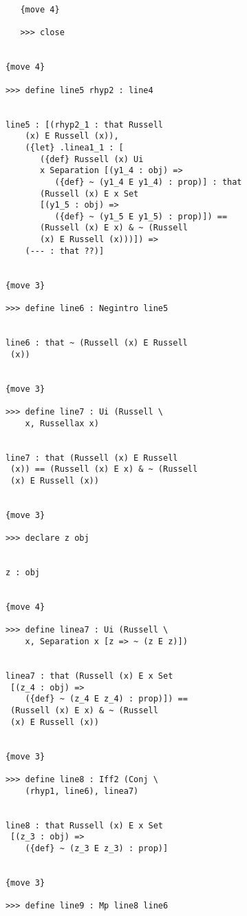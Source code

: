 \documentclass[12pt]{article}
\begin{document}
\begin{verbatim}
               {move 4}

               >>> close


            {move 4}

            >>> define line5 rhyp2 : line4


            line5 : [(rhyp2_1 : that Russell 
                (x) E Russell (x)), 
                ({let} .linea1_1 : [
                   ({def} Russell (x) Ui 
                   x Separation [(y1_4 : obj) => 
                      ({def} ~ (y1_4 E y1_4) : prop)] : that 
                   (Russell (x) E x Set 
                   [(y1_5 : obj) => 
                      ({def} ~ (y1_5 E y1_5) : prop)]) == 
                   (Russell (x) E x) & ~ (Russell 
                   (x) E Russell (x)))]) => 
                (--- : that ??)]


            {move 3}

            >>> define line6 : Negintro line5


            line6 : that ~ (Russell (x) E Russell 
             (x))


            {move 3}

            >>> define line7 : Ui (Russell \
                x, Russellax x)


            line7 : that (Russell (x) E Russell 
             (x)) == (Russell (x) E x) & ~ (Russell 
             (x) E Russell (x))


            {move 3}

            >>> declare z obj


            z : obj


            {move 4}

            >>> define linea7 : Ui (Russell \
                x, Separation x [z => ~ (z E z)])


            linea7 : that (Russell (x) E x Set 
             [(z_4 : obj) => 
                ({def} ~ (z_4 E z_4) : prop)]) == 
             (Russell (x) E x) & ~ (Russell 
             (x) E Russell (x))


            {move 3}

            >>> define line8 : Iff2 (Conj \
                (rhyp1, line6), linea7)


            line8 : that Russell (x) E x Set 
             [(z_3 : obj) => 
                ({def} ~ (z_3 E z_3) : prop)]


            {move 3}

            >>> define line9 : Mp line8 line6



\end{verbatim}
\end{document}

